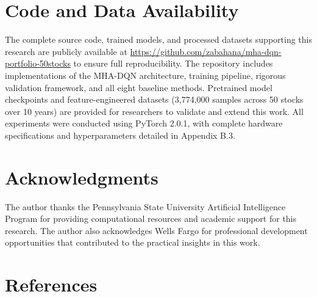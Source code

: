 \documentclass[11pt]{article}
\begin{document}
\section*{Code and Data Availability}

The complete source code, trained models, and processed datasets supporting this research are publicly available at \url{https://github.com/zabahana/mha-dqn-portfolio-50stocks} to ensure full reproducibility. The repository includes implementations of the MHA-DQN architecture, training pipeline, rigorous validation framework, and all eight baseline methods. Pretrained model checkpoints and feature-engineered datasets (3,774,000 samples across 50 stocks over 10 years) are provided for researchers to validate and extend this work. All experiments were conducted using PyTorch 2.0.1, with complete hardware specifications and hyperparameters detailed in Appendix B.3.

\section*{Acknowledgments}

The author thanks the Pennsylvania State University Artificial Intelligence Program for providing computational resources and academic support for this research. The author also acknowledges Wells Fargo for professional development opportunities that contributed to the practical insights in this work.

\section*{References}
\end{document}
